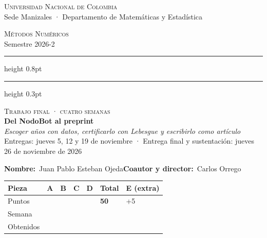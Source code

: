 
\newcommand{\docpie}{Trabajo final · Del NodoBot al preprint}

\newcommand{\cabeceratf}[3]{%
  \thispagestyle{fancy}%
  \noindent\begin{minipage}[t]{0.64\textwidth}\small
    \textsc{Universidad Nacional de Colombia}\\
    Sede Manizales · Departamento de Matemáticas y Estadística
  \end{minipage}\hfill
  \begin{minipage}[t]{0.34\textwidth}\small\raggedleft
    \textsc{Métodos Numéricos}\\
    Semestre 2026-2
  \end{minipage}\par\vspace{5pt}
  \hrule height 0.8pt\vspace{1.5pt}\hrule height 0.3pt
  \vspace{14pt}
  \begin{center}
    {\small\scshape Trabajo final · cuatro semanas}\\[6pt]
    {\LARGE\bfseries #1}\\[5pt]
    {\large\itshape #2}\\[8pt]
    {\small #3}
  \end{center}
  \vspace{4pt}
  \noindent\textbf{Nombre:}\ Juan Pablo Esteban Ojeda\hfill\textbf{Coautor y director:}\ Carlos Orrego\par\vspace{10pt}
  \begin{center}
  \begin{tabular}{l*{6}{>{\centering\arraybackslash}p{1.3cm}}}
    \toprule
    Pieza & A & B & C & D & \textbf{Total} & E (extra)\\
    \midrule
    Puntos & 10 & 12 & 14 & 14 & \textbf{50} & +5\\
    Semana & 1 & 2 & 3 & 4 & & 4\\
    \midrule
    Obtenidos\rule[-0.45cm]{0pt}{1.0cm} & & & & & & \\
    \bottomrule
  \end{tabular}
  \end{center}
  \vspace{2pt}}


\cabeceratf{Del NodoBot al preprint}{Escoger años con datos, certificarlo con Lebesgue y escribirlo como artículo}{Entregas: jueves 5, 12 y 19 de noviembre · Entrega final y sustentación: jueves 26 de noviembre de 2026}

